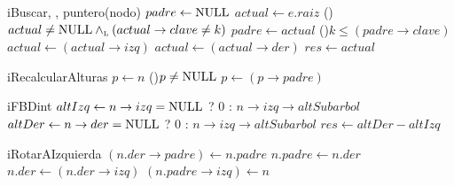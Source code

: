 \begin{Algoritmos}
  \begin{algoritmo}{iBuscar}{, , }{puntero(nodo)}
    $padre \gets \textrm{NULL}$  
    $actual \gets e.raiz$  
    \While(){$actual \neq \textrm{NULL} \land_{\mathrm{\scriptscriptstyle{L}}} (actual \to clave \neq k)$}{ %
      $padre \gets actual$ 
      \eIf(){$k \leq (padre \to clave)$}{
        $actual \gets (actual \to izq)$ 
      }{
        $actual \gets (actual \to der)$ 
      }
    }
    $res \gets actual$ 
  \end{algoritmo}

  \begin{algoritmo}{iRecalcularAlturas}{}{}
     $p \gets n$ 
    \While(){$p \neq \textrm{NULL}$}{
      $p \gets (p \to padre)$ 
    }
  \end{algoritmo}

  \begin{algoritmo}{iFBD}{}{int}
     $altIzq \gets n \to izq = \textrm{NULL}$ ? 0 : $n \to izq \to altSubarbol$ 
     $altDer \gets n \to der = \textrm{NULL}$ ? 0 : $n \to izq \to altSubarbol$ 
    $res \gets altDer - altIzq$ 
  \end{algoritmo}

  \begin{algoritmo}{iRotarAIzquierda}{}{}
    $(n.der \to padre) \gets n.padre$ \; 
    $n.padre \gets n.der$ \;
    $n.der \gets (n.der \to izq)$ \;
    $(n.padre \to izq) \gets n$ \;
     \;
  \end{algoritmo}
  \complejidad{}


\end{Algoritmos}
